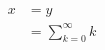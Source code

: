 \documentclass{article}
\begin{document}
\begin{align*}
    x &= y \\
      &= \sum_{k=0}^\infty k
\end{align*}
\end{document}
